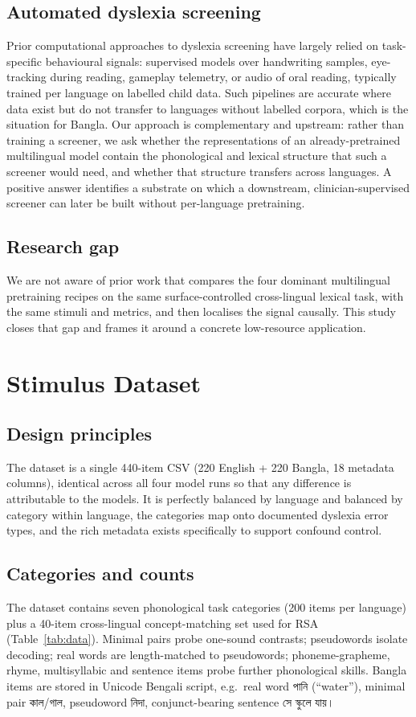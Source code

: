 \documentclass[conference]{IEEEtran}
\newcommand{\bn}[1]{{\banglafont #1}}
\begin{document}
\subsection{Automated dyslexia screening}
Prior computational approaches to dyslexia screening have largely relied on task-specific behavioural signals: supervised models over handwriting samples, eye-tracking during reading, gameplay telemetry, or audio of oral reading, typically trained per language on labelled child data. Such pipelines are accurate where data exist but do not transfer to languages without labelled corpora, which is the situation for Bangla. Our approach is complementary and upstream: rather than training a screener, we ask whether the representations of an already-pretrained multilingual model contain the phonological and lexical structure that such a screener would need, and whether that structure transfers across languages. A positive answer identifies a substrate on which a downstream, clinician-supervised screener can later be built without per-language pretraining.

\subsection{Research gap}
We are not aware of prior work that compares the four dominant multilingual pretraining recipes on the same surface-controlled cross-lingual lexical task, with the same stimuli and metrics, and then localises the signal causally. This study closes that gap and frames it around a concrete low-resource application.

\section{Stimulus Dataset}
\subsection{Design principles}
The dataset is a single 440-item CSV (220 English + 220 Bangla, 18 metadata columns), identical across all four model runs so that any difference is attributable to the models. It is perfectly balanced by language and balanced by category within language, the categories map onto documented dyslexia error types, and the rich metadata exists specifically to support confound control.

\subsection{Categories and counts}
The dataset contains seven phonological task categories (200 items per language) plus a 40-item cross-lingual concept-matching set used for RSA (Table~\ref{tab:data}). Minimal pairs probe one-sound contrasts; pseudowords isolate decoding; real words are length-matched to pseudowords; phoneme-grapheme, rhyme, multisyllabic and sentence items probe further phonological skills. Bangla items are stored in Unicode Bengali script, e.g.\ real word \bn{পানি} (``water''), minimal pair \bn{কাল}/\bn{গাল}, pseudoword \bn{নিদা}, conjunct-bearing sentence \bn{সে স্কুলে যায়।}
\end{document}
